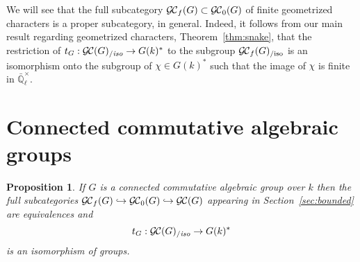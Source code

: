 \documentclass[11pt]{amsart}
\theoremstyle{plain}
\newtheorem{proposition}[theorem]{Proposition}
\theoremstyle{definition}
\theoremstyle{remark}
\newcommand{\EE}{\mathbb{\bar Q}_\ell}
\newcommand{\bFq}{\bar{k}}
\newcommand{\Fq}{k}
\newcommand{\EEx}{\EE^\times}
\DeclareMathOperator{\Gal}{Gal}
\newcommand{\Frob}[1]{{\operatorname{F}_{#1}}}
\DeclareMathOperator{\Aut}{Aut}
\newcommand{\ceq}{{\, :=\, }}
\newcommand{\GC}{{\mathcal{G\hskip-0.8pt C}}}
\newcommand{\GCb}{{\GC_0}}
\newcommand{\GCf}{{\GC_f}}
\newcommand{\GCiso}[1]{\GC(#1)_{/\textit{iso}}}
\newcommand{\GCfiso}[1]{\GCf(#1)_{/\text{iso}}}
\newcommand{\trFrob}[1]{t_{#1}}
\newcommand\Clifton[1]{\marginpar{\smaller\smaller CC: #1}}
\begin{document}

We will see that the full subcategory $\GC_f(G) \subset \GC_0(G)$ of finite geometrized characters is a proper subcategory, in general. Indeed, it follows from our main result regarding geometrized characters, Theorem~\ref{thm:snake}, that the restriction of $\trFrob{G} : \GCiso{G} \to G(\Fq)^*$ to the subgroup $\GCfiso{G}$ is an isomorphism onto the subgroup of $\chi \in G(\Fq)^*$ such that the image of $\chi$ is finite in $\EEx$. 
 
\section{Connected commutative algebraic groups}

%

\begin{proposition}\label{prop:connected}
  If $G$ is a connected commutative algebraic group over $\Fq$ then 
  the full subcategories $\GCf(G) \hookrightarrow \GCb(G) \hookrightarrow \GC(G)$ 
  appearing in Section~\ref{sec:bounded} are equivalences 
  and
  \[
  \trFrob{G} : \GCiso{G} \to G(\Fq)^*
  \]
  is an isomorphism of groups.
\end{proposition}
\end{document}
